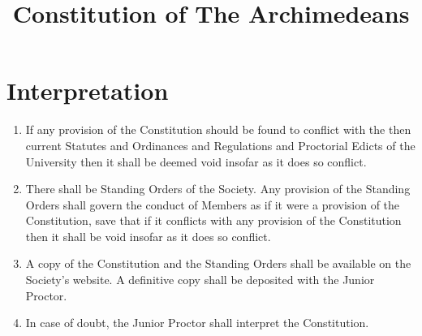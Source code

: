 \documentclass{article}
\title{Constitution of The Archimedeans}
\date{\formatdate{12}{3}{2019}}
\begin{document}
\maketitle

\small{}

\section{Interpretation}

\begin{enumerate}
\item If any provision of the Constitution should be found to conflict with the
then current Statutes and Ordinances and Regulations and Proctorial
Edicts of the University then it shall be deemed void insofar as it does so
conflict.
\item There shall be Standing Orders of the Society. Any provision of the Standing Orders shall govern the conduct of Members as if it were a provision
of the Constitution, save that if it conflicts with any provision of the Constitution then it shall be void insofar as it does so conflict.
\item A copy of the Constitution and the Standing Orders shall be available on
the Society's website. A definitive copy shall be deposited with the Junior
Proctor.
\item In case of doubt, the Junior Proctor shall interpret the Constitution.
\end{enumerate}
\end{document}
